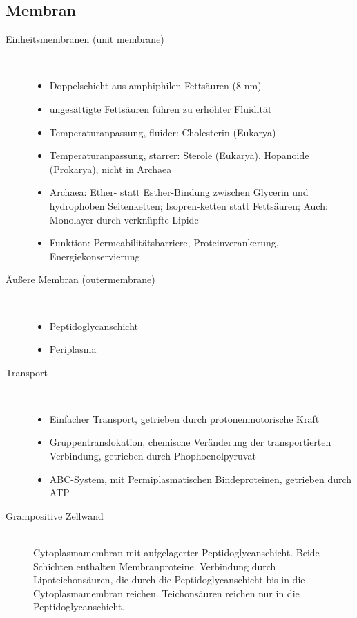 \subsection{Membran}
\begin{description}
	\item[Einheitsmembranen (unit membrane)] \hfill \\
		\begin{itemize}
			\item Doppelschicht aus amphiphilen Fettsäuren (8 nm)
			\item ungesättigte Fettsäuren führen zu erhöhter Fluidität
			\item Temperaturanpassung, fluider: Cholesterin (Eukarya)
			\item Temperaturanpassung, starrer: Sterole (Eukarya), Hopanoide (Prokarya), nicht in Archaea
			\item Archaea: Ether- statt Esther-Bindung zwischen Glycerin und hydrophoben Seitenketten; 
				Isopren-ketten statt Fettsäuren; Auch: Monolayer durch verknüpfte Lipide
			\item Funktion: Permeabilitätsbarriere, Proteinverankerung, Energiekonservierung
		\end{itemize}

	\item[Äußere Membran (outermembrane)] \hfill \\
		\begin{itemize}
			\item Peptidoglycanschicht
			\item Periplasma
		\end{itemize}

	\item[Transport] \hfill \\
		\begin{itemize}
			\item Einfacher Transport, getrieben durch protonenmotorische Kraft
			\item Gruppentranslokation, chemische Veränderung der transportierten Verbindung,
				getrieben durch Phophoenolpyruvat
			\item ABC-System, mit Permiplasmatischen Bindeproteinen,
				getrieben durch ATP
		\end{itemize}

	\item[Grampositive Zellwand] \hfill \\
		Cytoplasmamembran mit aufgelagerter Peptidoglycanschicht.
		Beide Schichten enthalten Membranproteine.
		Verbindung durch Lipoteichonsäuren,
		die durch die Peptidoglycanschicht bis in die Cytoplasmamembran reichen.
		Teichonsäuren reichen nur in die Peptidoglycanschicht.


\end{description}
